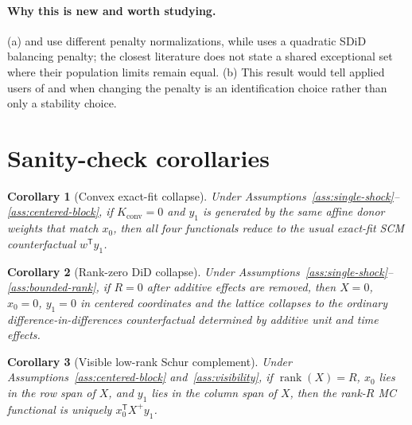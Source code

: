 \documentclass[11pt]{article}
\newcommand{\transpose}{\mathsf{T}}
\theoremstyle{definition}
\theoremstyle{plain}
\newtheorem{corollary}{Corollary}
\theoremstyle{remark}
\begin{document}
\paragraph{Why this is new and worth studying.}
(a) \citet{BenMichaelFellerRothstein2021} and
\citet{AtheyBayatiDoudchenkoImbensKhosravi2021} use different penalty
normalizations, while \citet{ArkhangelskyAtheyHirshbergImbensWager2021} uses a
quadratic SDiD balancing penalty; the closest literature does not state a
shared exceptional set where their population limits remain equal. (b) This
result would tell applied users of \citet{ArkhangelskyAtheyHirshbergImbensWager2021}
and \citet{BenMichaelFellerRothstein2021} when changing the penalty is an
identification choice rather than only a stability choice.

\section{Sanity-check corollaries}
\begin{corollary}[Convex exact-fit collapse]\label{cor:convex-collapse}
Under Assumptions~\ref{ass:single-shock}--\ref{ass:centered-block}, if
$K_{\mathrm{conv}}=0$ and $y_1$ is generated by the same affine donor weights
that match $x_0$, then all four functionals reduce to the usual exact-fit SCM
counterfactual $w^{\transpose}y_1$.
\end{corollary}

\begin{corollary}[Rank-zero DiD collapse]\label{cor:rank-zero-collapse}
Under Assumptions~\ref{ass:single-shock}--\ref{ass:bounded-rank}, if $R=0$
after additive effects are removed, then $X=0$, $x_0=0$, $y_1=0$ in centered
coordinates and the lattice collapses to the ordinary difference-in-differences
counterfactual determined by additive unit and time effects.
\end{corollary}

\begin{corollary}[Visible low-rank Schur complement]\label{cor:schur-collapse}
Under Assumptions~\ref{ass:centered-block} and~\ref{ass:visibility}, if
$\operatorname{rank}(X)=R$, $x_0$ lies in the row span of $X$, and $y_1$ lies in
the column span of $X$, then the rank-$R$ MC functional is uniquely
$x_0^{\transpose}X^+y_1$.
\end{corollary}
\end{document}
